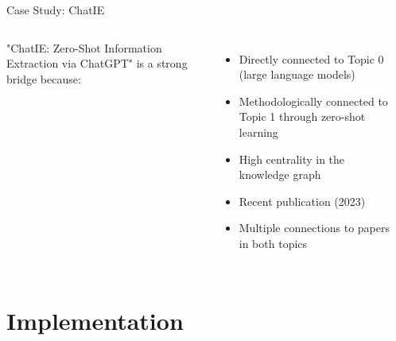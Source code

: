 \documentclass{beamer}
\begin{document}
\begin{frame}{Case Study: ChatIE}
    \begin{columns}
        "ChatIE: Zero-Shot Information Extraction via ChatGPT" is a strong bridge because:
        \begin{itemize}
            \item Directly connected to Topic 0 (large language models)
            \item Methodologically connected to Topic 1 through zero-shot learning
            \item High centrality in the knowledge graph
            \item Recent publication (2023)
            \item Multiple connections to papers in both topics
        \end{itemize}
        
        \begin{center}
        \end{center}
    \end{columns}
\end{frame}

\section{Implementation}
\end{document}
